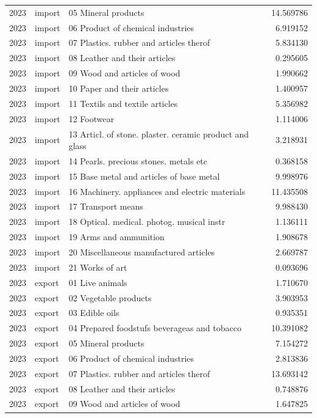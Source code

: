 \begin{tabular}{rllr}
2023 & import & 05 Mineral products & 14.569786 \\
2023 & import & 06 Product of chemical industries & 6.919152 \\
2023 & import & 07 Plastics. rubber and articles therof & 5.834130 \\
2023 & import & 08 Leather and their articles & 0.295605 \\
2023 & import & 09 Wood and articles of wood & 1.990662 \\
2023 & import & 10 Paper and their articles & 1.400957 \\
2023 & import & 11 Textils and textile articles & 5.356982 \\
2023 & import & 12 Footwear & 1.114006 \\
2023 & import & 13 Articl. of stone. plaster. ceramic product and glass & 3.218931 \\
2023 & import & 14 Pearls. precious stones. metals etc & 0.368158 \\
2023 & import & 15 Base metal and articles of base metal & 9.998976 \\
2023 & import & 16 Machinery. appliances and electric materials & 11.435508 \\
2023 & import & 17 Transport means & 9.988430 \\
2023 & import & 18 Optical. medical. photog. musical instr & 1.136111 \\
2023 & import & 19 Arms and ammunition & 1.908678 \\
2023 & import & 20 Miscellaneous manufactured articles & 2.669787 \\
2023 & import & 21 Works of art & 0.093696 \\
2023 & export & 01 Live animals & 1.710670 \\
2023 & export & 02 Vegetable products & 3.903953 \\
2023 & export & 03 Edible oils & 0.935351 \\
2023 & export & 04 Prepared foodstufs beverageas and tobacco & 10.391082 \\
2023 & export & 05 Mineral products & 7.154272 \\
2023 & export & 06 Product of chemical industries & 2.813836 \\
2023 & export & 07 Plastics. rubber and articles therof & 13.693142 \\
2023 & export & 08 Leather and their articles & 0.748876 \\
2023 & export & 09 Wood and articles of wood & 1.647825 \\

\end{tabular}
